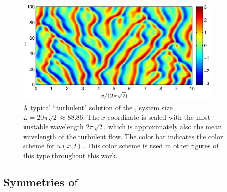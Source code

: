\begin{figure}[t]
\begin{center}
\includegraphics[width=0.9\textwidth]{figs/ks_largeL_cbar.eps}
\end{center}
\caption{
A typical ``turbulent" solution of the \KSe, system size
$L=20\pi\sqrt{2}\approx 88.86$.  The $x$ coordinate is scaled 
with the most unstable wavelength $2\pi\sqrt{2}$, which is 
approximately also the mean wavelength of the turbulent flow. 
The color bar indicates the color scheme for $u(x,t)$.  This color 
scheme is used in other figures of this type throughout this work.
     } \label{f:ks_largeL}
\end{figure}


\subsection{Symmetries of \KSe}
\label{sec:KSeSymm}

